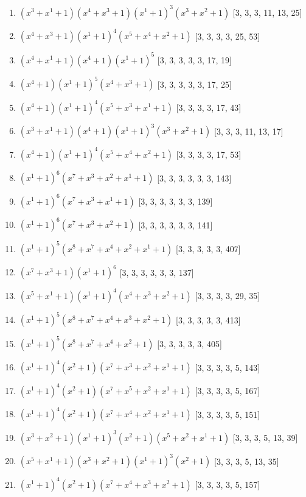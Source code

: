 \documentclass[10pt,twocolumn]{article}
\begin{document}
\begin{enumerate}
\item $(x^{3} + x^{1} + 1)(x^{4} + x^{3} + 1)(x^{1} + 1)^{3}(x^{3} + x^{2} + 1)$  [3, 3, 3, 11, 13, 25]
\item $(x^{4} + x^{3} + 1)(x^{1} + 1)^{4}(x^{5} + x^{4} + x^{2} + 1)$  [3, 3, 3, 3, 25, 53]
\item $(x^{4} + x^{1} + 1)(x^{4} + 1)(x^{1} + 1)^{5}$  [3, 3, 3, 3, 3, 17, 19]
\item $(x^{4} + 1)(x^{1} + 1)^{5}(x^{4} + x^{3} + 1)$  [3, 3, 3, 3, 3, 17, 25]
\item $(x^{4} + 1)(x^{1} + 1)^{4}(x^{5} + x^{3} + x^{1} + 1)$  [3, 3, 3, 3, 17, 43]
\item $(x^{3} + x^{1} + 1)(x^{4} + 1)(x^{1} + 1)^{3}(x^{3} + x^{2} + 1)$  [3, 3, 3, 11, 13, 17]
\item $(x^{4} + 1)(x^{1} + 1)^{4}(x^{5} + x^{4} + x^{2} + 1)$  [3, 3, 3, 3, 17, 53]
\item $(x^{1} + 1)^{6}(x^{7} + x^{3} + x^{2} + x^{1} + 1)$  [3, 3, 3, 3, 3, 3, 143]
\item $(x^{1} + 1)^{6}(x^{7} + x^{3} + x^{1} + 1)$  [3, 3, 3, 3, 3, 3, 139]
\item $(x^{1} + 1)^{6}(x^{7} + x^{3} + x^{2} + 1)$  [3, 3, 3, 3, 3, 3, 141]
\item $(x^{1} + 1)^{5}(x^{8} + x^{7} + x^{4} + x^{2} + x^{1} + 1)$  [3, 3, 3, 3, 3, 407]
\item $(x^{7} + x^{3} + 1)(x^{1} + 1)^{6}$  [3, 3, 3, 3, 3, 3, 137]
\item $(x^{5} + x^{1} + 1)(x^{1} + 1)^{4}(x^{4} + x^{3} + x^{2} + 1)$  [3, 3, 3, 3, 29, 35]
\item $(x^{1} + 1)^{5}(x^{8} + x^{7} + x^{4} + x^{3} + x^{2} + 1)$  [3, 3, 3, 3, 3, 413]
\item $(x^{1} + 1)^{5}(x^{8} + x^{7} + x^{4} + x^{2} + 1)$  [3, 3, 3, 3, 3, 405]
\item $(x^{1} + 1)^{4}(x^{2} + 1)(x^{7} + x^{3} + x^{2} + x^{1} + 1)$  [3, 3, 3, 3, 5, 143]
\item $(x^{1} + 1)^{4}(x^{2} + 1)(x^{7} + x^{5} + x^{2} + x^{1} + 1)$  [3, 3, 3, 3, 5, 167]
\item $(x^{1} + 1)^{4}(x^{2} + 1)(x^{7} + x^{4} + x^{2} + x^{1} + 1)$  [3, 3, 3, 3, 5, 151]
\item $(x^{3} + x^{2} + 1)(x^{1} + 1)^{3}(x^{2} + 1)(x^{5} + x^{2} + x^{1} + 1)$  [3, 3, 3, 5, 13, 39]
\item $(x^{5} + x^{1} + 1)(x^{3} + x^{2} + 1)(x^{1} + 1)^{3}(x^{2} + 1)$  [3, 3, 3, 5, 13, 35]
\item $(x^{1} + 1)^{4}(x^{2} + 1)(x^{7} + x^{4} + x^{3} + x^{2} + 1)$  [3, 3, 3, 3, 5, 157]

\end{enumerate}
\end{document}
